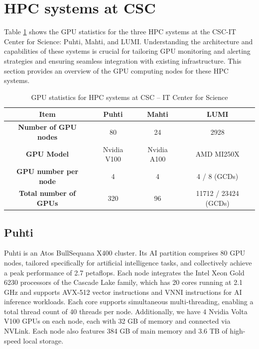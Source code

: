 
\section{HPC systems at CSC}
Table \ref{tab:gpu_details} shows the GPU statistics for the three HPC systems at the CSC-IT Center for Science: Puhti, Mahti, and LUMI. Understanding the architecture and capabilities of these systems is crucial for tailoring GPU monitoring and alerting strategies and ensuring seamless integration with existing infrastructure. This section provides an overview of the GPU computing nodes for these HPC systems.

\begin{table}[H]
    \centering
    \begin{tabular}{|c|ccc|}
     \hline
     \textbf{Item} & \textbf{Puhti} & \textbf{Mahti} & \textbf{LUMI} \\
     \hline
     \textbf{Number of GPU nodes} & 80 & 24 & 2928 \\
     \hline
     \textbf{GPU Model} & Nvidia V100 & Nvidia A100 & AMD MI250X \\
     \hline
     \textbf{GPU number per node} & 4 & 4 & 4 / 8 (GCDs) \\
     \hline
     \textbf{Total number of GPUs} & 320 & 96 & 11712 / 23424 (GCDs) \\
     \hline
    \end{tabular}
    \caption{GPU statistics for HPC systems at CSC -- IT Center for Science}
    \label{tab:gpu_details}
\end{table}

\subsection{Puhti}
Puhti \cite{puhti} is an Atos BullSequana X400 cluster. Its AI partition comprises 80 GPU nodes, tailored specifically for artificial intelligence tasks, and collectively achieve a peak performance of 2.7 petaflops. Each node integrates the Intel Xeon Gold 6230 processors of the Cascade Lake family, which has 20 cores running at 2.1 GHz and supports AVX-512 vector instructions and VNNI instructions for AI inference workloads. Each core supports simultaneous multi-threading, enabling a total thread count of 40 threads per node. Additionally, we have 4 Nvidia Volta V100 GPUs on each node, each with 32 GB of memory and connected via NVLink. Each node also features 384 GB of main memory and 3.6 TB of high-speed local storage.

